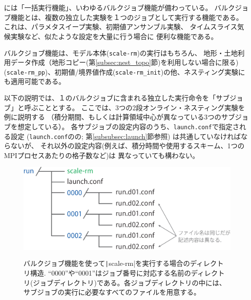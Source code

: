 \section{\SecAdvanceBulkjob} \label{sec:bulkjob}

\scalerm には「一括実行機能」、いわゆるバルクジョブ機能が備わっている。
バルクジョブ機能とは、複数の独立した実験を１つのジョブとして実行する機能である。
これは、パラメタスイープ実験、初期値アンサンブル実験、
タイムスライス気候実験など、似たような設定を大量に行う場合に
便利な機能である。

バルクジョブ機能は、モデル本体(\verb|scale-rm|)の実行はもちろん、
地形・土地利用データ作成（地形コピー(第\ref{subsec:nest_topo}節)を利用しない場合に限る) (\verb|scale-rm_pp|)、初期値/境界値作成(\verb|scale-rm_init|)の他、ネスティング実験にも適用可能である。

以下の説明では、１のバルクジョブに含まれる独立した実行命令を「サブジョブ」と呼ぶこととする。
ここでは、3つの2段オンライン・ネスティング実験を例に説明する
（積分期間、もしくは計算領域中心が異なっている3つのサブジョブを想定している）。
%
各サブジョブの設定内容のうち、\verb|launch.conf|で指定される設定
(\verb|launch.conf|のの;
第\ref{subsubsec:launch}節参照) は共通していなければならないが、
それ以外の設定内容(例えば、積分時間や使用するスキーム、1つのMPIプロセスあたりの格子数など)は
異なっていても構わない。


\begin{figure}[t]
\begin{center}
  \includegraphics[width=0.6\hsize]{./figure/bulkjob_directory_structure.eps}\\
  \caption{バルクジョブ機能を使って\texttt|scale-rm|を実行する場合のディレクトリ構造. ``0000''や``0001''はジョブ番号に対応する名前のディレクトリ(ジョブディレクトリ)である。各ジョブディレクトリの中には、サブジョブの実行に必要なすべてのファイルを用意する。}
  \label{fig_bulkjob}
\end{center}
\end{figure}


